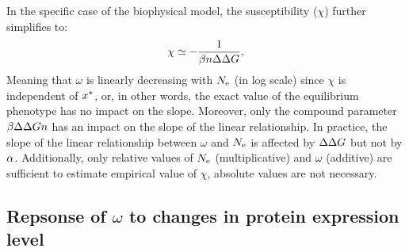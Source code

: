 In the specific case of the biophysical model, the susceptibility ($\chi$) further simplifies to:
\begin{gather}
    \chi \simeq -\dfrac{1}{\beta \NbrSites \DeltaDeltaG}, \label{eq:chi_application}
\end{gather}
Meaning that $\omega$ is linearly decreasing with $N_{\mathrm{e}}$ (in log scale) since $\chi$ is independent of $x^{*}$, or, in other words, the exact value of the equilibrium phenotype has no impact on the slope.
Moreover, only the compound parameter $\beta \Delta \Delta G n$ has an impact on the slope of the linear relationship.
In practice, the slope of the linear relationship between $\omega$ and $N_{\mathrm{e}}$ is affected by $\Delta \Delta G$ but not by $\alpha$.
Additionally, only relative values of $N_{\mathrm{e}}$ (multiplicative) and $\omega$ (additive) are sufficient to estimate empirical value of $\chi$, absolute values are not necessary.

\subsection{Repsonse of \texorpdfstring{$\omega$}{ω} to changes in protein expression level}
\label{sec:expression}

